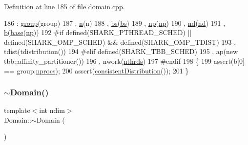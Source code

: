 Definition at line 185 of file domain.\+cpp.


\begin{DoxyCode}
186     : \hyperlink{classshark_1_1ndim_1_1_domain_a2bbf100371762ce405efd218bc1e3d0f}{group}(group)
187     , \hyperlink{classshark_1_1ndim_1_1_domain_ab942ffcf99c5ee0f2589c8b9104abcfd}{n}(n)
188         , \hyperlink{classshark_1_1ndim_1_1_domain_a2be17b3d153f7fbbede6eec0afd17ebe}{bs}(\hyperlink{classshark_1_1ndim_1_1_domain_a2be17b3d153f7fbbede6eec0afd17ebe}{bs})
189     , \hyperlink{classshark_1_1ndim_1_1_domain_a1d15ab99cb54dcc456c5bba8699bcddf}{np}(\hyperlink{classshark_1_1ndim_1_1_domain_a1d15ab99cb54dcc456c5bba8699bcddf}{np})
190     , \hyperlink{classshark_1_1ndim_1_1_domain_a4964336cc4ccdb2bfcc616fdcbb9a570}{nd}(\hyperlink{classshark_1_1ndim_1_1_domain_a4964336cc4ccdb2bfcc616fdcbb9a570}{nd})
191     , \hyperlink{classshark_1_1ndim_1_1_domain_a3b9ed7ea09cc2d90575a43f92cc4e105}{b}(\hyperlink{classshark_1_1ndim_1_1_domain_a9335637df58667fdf13f6f861281c973}{base}(\hyperlink{classshark_1_1ndim_1_1_domain_a1d15ab99cb54dcc456c5bba8699bcddf}{np}))
192 \textcolor{preprocessor}{#if defined(SHARK\_PTHREAD\_SCHED) || defined(SHARK\_OMP\_SCHED) && defined(SHARK\_OMP\_TDIST)}
193     , tdist(tdistribution())
194 \textcolor{preprocessor}{#elif defined(SHARK\_TBB\_SCHED)}
195     , ap(\textcolor{keyword}{new} tbb::affinity\_partitioner())
196     , nwork(\hyperlink{namespaceshark_a4912c1d983c9655b4ed992ac1f99530f}{nthrds})
197 \textcolor{preprocessor}{#endif}
198 \{
199     assert(b[0] == group.\hyperlink{classshark_1_1_group_a90e041a7fa6c40c924b17f8c2006e6b2}{nprocs});
200     assert(\hyperlink{classshark_1_1ndim_1_1_domain_af10c994124cd93210194db65d5bb3c5b}{consistentDistribution}());
201 \}
\end{DoxyCode}
\hypertarget{classshark_1_1ndim_1_1_domain_a29cec9afb2e54c810ba1f3c1a49543a8}{}\label{classshark_1_1ndim_1_1_domain_a29cec9afb2e54c810ba1f3c1a49543a8} 
\subsubsection{\texorpdfstring{$\sim$\+Domain()}{~Domain()}}
{\footnotesize\ttfamily template$<$int ndim$>$ \\
Domain\+::$\sim$\+Domain (\begin{DoxyParamCaption}{ }\end{DoxyParamCaption})}

